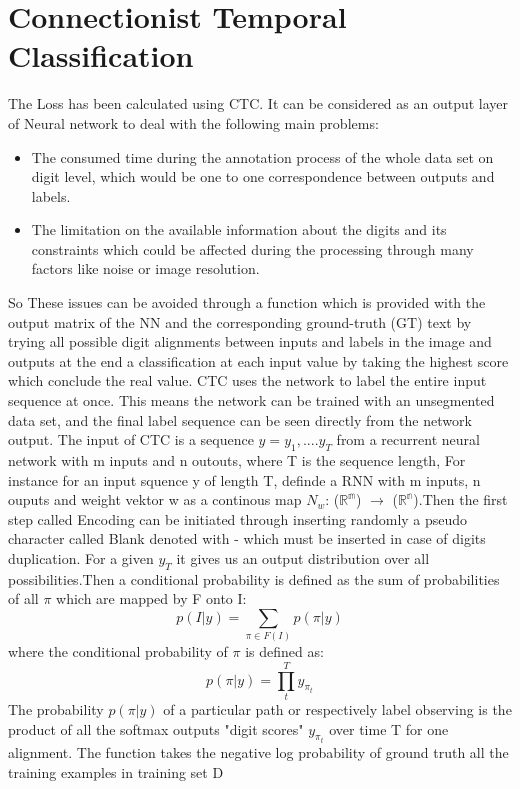 \section{Connectionist Temporal Classification}\label{sec:ctc}

The Loss has been calculated using CTC. It can be considered as an output layer of Neural network to deal with the following main problems:
\begin{itemize}
\item The consumed time during the annotation process of the whole data set on digit level, which would be one to one correspondence between outputs and labels.
\item The limitation on the available information about the digits and its constraints which could be affected during the processing through many factors like noise or image resolution.
\end{itemize}
So These issues can be avoided through a function which is provided with the output matrix of the NN and the corresponding ground-truth (GT) text by trying all possible digit alignments between inputs and labels in the image and outputs at the end a classification at each input value by taking the highest score which conclude the real value. CTC uses the network to label the entire input sequence at once. This means the network can be trained with an unsegmented data set, and the final label sequence can be seen directly from the network output. The input of CTC is a sequence $y=y_{1},....y_{T}$ from a recurrent neural network with m inputs and n outouts, where T is the sequence length, For instance for an input squence y of length T, definde a RNN with m inputs, n ouputs and weight vektor w as a continous map $N_w$: ($\mathbb{R^m}$) $\rightarrow$  ($\mathbb{R^n}$).Then the first step called Encoding can be initiated through inserting randomly a pseudo character called Blank denoted with {-} which must be inserted in case of digits duplication. For a given $y_{T}$ it gives us an output distribution over all possibilities.Then a conditional probability is defined as the sum of probabilities of all $\pi$ which are mapped by F onto I:
\begin{equation}
p( I | y)=\sum_{\pi \in F(I)} p( \pi | y )
\label{eq3}
\end{equation}
where the conditional probability of $\pi$ is defined as: 
\begin{equation}
p( \pi | y ) =\prod_t^T y_{\pi_{t}}
\label{eq3}
\end{equation}
The probability $p( \pi | y )$ of a particular path or respectively label observing is the product of all the softmax outputs "digit scores" $y_{\pi_{t}}$ over time T for one alignment. The function takes the negative log probability of ground truth all the training examples in training set D
